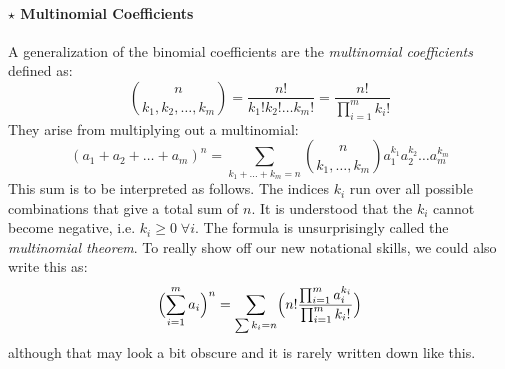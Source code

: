 \paragraph{$\star$ Multinomial Coefficients}
A generalization of the binomial coefficients are the \emph{multinomial coefficients} defined as:
\begin{equation}
\label{Eq:MultinomialCoeffs}
 \binom{n}{k_1,k_2,\ldots,k_m} 
= \frac{n!}{k_1! k_2! \ldots k_m!}
= \frac{n!}{ \prod_{i=1}^{m} k_i ! }
\end{equation}
They arise from multiplying out a multinomial:
\begin{equation}
\label{Eq:MultinomialTheorem}
(a_1 + a_2 + \ldots + a_m)^n 
= \sum_{k_1+\ldots+k_m = n} \binom{n}{k_1, \ldots, k_m} a_1^{k_1} a_2^{k_2} \ldots a_m^{k_m}
\end{equation}
This sum is to be interpreted as follows. The indices $k_i$ run over all possible combinations that give a total sum of $n$. It is understood that the $k_i$ cannot become negative, i.e. $k_i \geq 0 \; \forall i$. The formula is unsurprisingly called the \emph{multinomial theorem}. To really show off our new notational skills, we could also write this as:
\begin{equation}
\Bigl( \sum_{i=1}^{m} a_i \Bigr)^n
= \sum_{\sum k_i = n} \Bigl( n! \frac{\prod_{i=1}^{m} a_i^{k_i}} {\prod_{i=1}^{m} k_i!} \Bigr)
\end{equation}
although that may look a bit obscure and it is rarely written down like this.


\begin{comment}

I think, the generalization of the formula (\ref{Eq:BinomialCoeffsSum}) can be found by rewriting the formula as:

  \sum_{k_1 + k_2 = n} \binom{n}{k} 
= \sum_{k_1 + k_2 = n} \frac{n!}{k_1! k_2!}
= 2^n

and then generalizing to

\sum_{k_1 + \ldots  + k_m = n} \frac{n!}{k_1! \ldots k_m!}
= m^n

The result can be derived by considering the general formula for multinomial coeffs and the considering the special case of all a_i being equal to 1. ...or maybe by letting them all be equal to some given a, expanding (a_1 + ... + a_m)^n = (m a)^n = m^n a^n. Then noticing that the product in the formual \prod_{i=1}^m a_i^{k_i} simplifies to a^n (because sum_i k_i = n) and then noting that a^n does not depend on any of the summation indices k_i, so it can be dragged out of the sum. Then we have that a^n times the sum-of-multinomial-coeffs must be equal to a^n times m^n and therefore, this sum must be m^n.



\end{comment}


